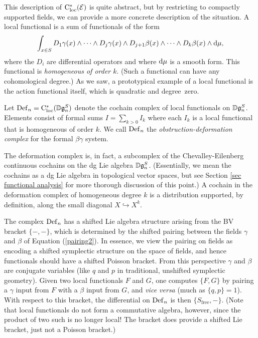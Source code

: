This description of ${\rm C}_{\rm loc}^*(\mathcal E)$ is quite abstract, but 
by restricting to compactly supported fields, we can provide a more concrete description of the situation. 
A local functional is a sum of functionals of the form
\[
\int_{x \in S} D_1\gamma(x) \wedge \cdots \wedge D_j\gamma(x) \wedge D_{j+1}\beta(x) \wedge\cdots \wedge D_k\beta(x)\wedge {\rm d} \mu,
\]
where the $D_i$ are differential operators and where ${\rm d}\mu$ is a smooth form.
This functional is {\em homogeneous of order $k$}.
(Such a functional can have any cohomological degree.)
As we saw, a prototypical example of a local functional is the action functional itself, which is quadratic and degree~zero.

\begin{dfn}
Let ${\rm Def}_n = {\rm C}_{\rm loc}^*(\mathbb D \mathfrak g_n^S)$ denote the cochain complex of local functionals on $\mathbb D \mathfrak g_n^S$.
Elements consist of formal sums $I = \sum_{k > 0} I_k$ where each $I_k$ is a local functional that is homogeneous of order $k$. We call ${\rm Def}_n$ the {\em obstruction-deformation complex} for the formal $\beta\gamma$ system.
\end{dfn}

The deformation complex is, in fact, a subcomplex of the Chevalley-Eilenberg continuous cochains on the dg Lie algebra $\mathbb D \mathfrak g_n^S$. 
(Essentially, we mean the cochains as a dg Lie algebra in topological vector spaces, but 
see Section \ref{sec functional analysis} for more thorough discussion of this point.)
A cochain in the deformation complex of homogeneous degree $k$ is a distribution supported, by definition, along the small diagonal $X \hookrightarrow X^k$.

The complex ${\rm Def}_n$ has a shifted Lie algebra structure arising from the BV bracket $\{-,-\}$,
which is determined by the shifted pairing between the fields $\gamma$ and $\beta$ of Equation (\ref{pairing2}).
In essence, we view the pairing on fields as encoding a shifted symplectic structure on the space of fields,
and hence functionals should have a shifted Poisson bracket.
From this perspective $\gamma$ and $\beta$ are conjugate variables (like $q$ and $p$ in traditional, unshifted symplectic geometry).
Given two local functionals $F$ and $G$, one computes $\{F,G\}$ by pairing a $\gamma$ input from $F$ with a $\beta$ input from $G$, and {\it vice versa} (much as $\{q,p\} = 1$).
With respect to this bracket, the differential on ${\rm Def}_n$ is then $\{S_{\text{free}},-\}$.
(Note that local functionals do not form a commutative algebra, however, since the product of two such is no longer local!
The bracket does provide a shifted Lie bracket, just not a Poisson bracket.)

